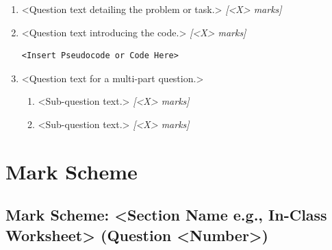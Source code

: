 \begin{enumerate}[leftmargin=*, label=(\alph*)]
  
  \item <Question text detailing the problem or task.> \textit{[<X> marks]}
  \vspace{<Provide logical vertical space for student answers, e.g., 2cm or 3cm>}

  \item <Question text introducing the code.> \textit{[<X> marks]}
  \begin{lstlisting}
<Insert Pseudocode or Code Here>
  \end{lstlisting}
  \vspace{2cm}

  \item <Question text for a multi-part question.>
  \begin{enumerate}[label=(\roman*), leftmargin=*, noitemsep]
    \item <Sub-question text.> \textit{[<X> marks]}
    \vspace{1.5cm}
    \item <Sub-question text.> \textit{[<X> marks]}
    \vspace{1.5cm}
  \end{enumerate}

\end{enumerate}

\newpage

\section*{Mark Scheme}

\subsection*{Mark Scheme: <Section Name e.g., In-Class Worksheet> (Question <Number>)}

